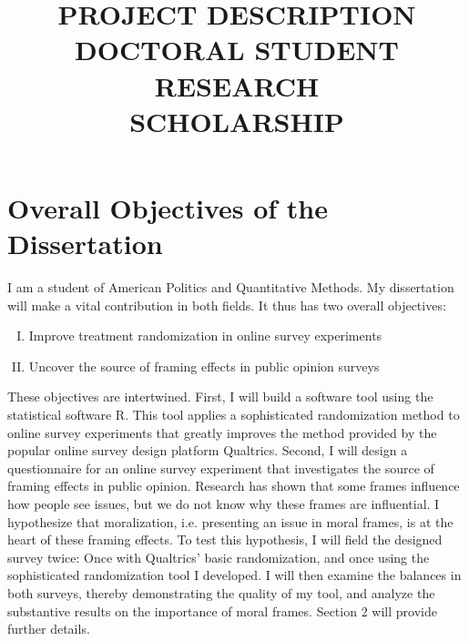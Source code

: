 \documentclass[11pt]{article}
\title{\textbf{\large{\textcolor{NavyBlue}{PROJECT DESCRIPTION}\\DOCTORAL STUDENT RESEARCH\\\vspace{-0.2cm}SCHOLARSHIP}}}
\date{}
\begin{document}
\maketitle

\vspace{-1.6cm}

\singlespacing

\section{Overall Objectives of the Dissertation}

\vspace{0.3cm}




I am a student of American Politics and Quantitative Methods. My dissertation will make a vital contribution in both fields. It thus has two overall objectives:

\vspace{-0.2cm}

\begin{enumerate}[I.]
	\item Improve treatment randomization in online survey experiments
	 \vspace{-0.3cm}
	\item Uncover the source of framing effects in public opinion surveys
\end{enumerate}

\vspace{-0.2cm}

These objectives are intertwined. First, I will build a software tool using the statistical software R. This tool applies a sophisticated randomization method to online survey experiments that greatly improves the method provided by the popular online survey design platform Qualtrics. Second, I will design a questionnaire for an online survey experiment that investigates the source of framing effects in public opinion. Research has shown that some frames influence how people see issues, but we do not know why these frames are influential. I hypothesize that moralization, i.e. presenting an issue in moral frames, is at the heart of these framing effects. To test this hypothesis, I will field the designed survey twice: Once with Qualtrics' basic randomization, and once using the sophisticated randomization tool I developed. I will then examine the balances in both surveys, thereby demonstrating the quality of my tool, and analyze the substantive results on the importance of moral frames. Section 2 will provide further details.
\end{document}
